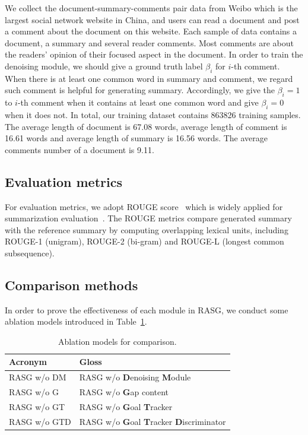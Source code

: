 \documentclass[letterpaper]{article}
\begin{document}
We collect the document-summary-comments pair data from Weibo which is the largest social network website in China, and users can read a document and post a comment about the document on this website.
Each sample of data contains a document, a summary and several reader comments.
Most comments are about the readers' opinion of their focused aspect in the document.
In order to train the denoising module, we should give a ground truth label $\beta_i$ for $i$-th comment.
When there is at least one common word in summary and comment, we regard such comment is helpful for generating summary.
Accordingly, we give the $\beta_i = 1$ to $i$-th comment when it contains at least one common word and give $\beta_i = 0$ when it does not.
In total, our training dataset contains 863826 training samples.
The average length of document is 67.08 words, average length of comment is 16.61 words and average length of summary is 16.56 words.
The average comments number of a document is 9.11.

\subsection{Evaluation metrics}

For evaluation metrics, we adopt ROUGE score~\cite{lin2004rouge} which is widely applied for summarization evaluation~\cite{Sun2018AUM,chen2018iterative}.
The ROUGE metrics compare generated summary with the reference summary by computing overlapping lexical units, including ROUGE-1 (unigram), ROUGE-2 (bi-gram) and ROUGE-L (longest common subsequence).

\subsection{Comparison methods}

In order to prove the effectiveness of each module in RASG, we conduct some ablation models introduced in Table~\ref{tab:ablations}.

\begin{table}[t]
\centering
\caption{Ablation models for comparison.}
\label{tab:ablations}
\small
\begin{tabular}{@{}l@{~}l}
\toprule
Acronym & Gloss \\
\midrule
RASG w/o DM &  \multicolumn{1}{p{5cm}}{\small RASG w/o \textbf{D}enoising \textbf{M}odule}\\
RASG w/o G &  \multicolumn{1}{p{5cm}}{\small RASG w/o \textbf{G}ap content}\\
RASG w/o GT &  \multicolumn{1}{p{5cm}}{\small RASG w/o \textbf{G}oal \textbf{T}racker}\\
RASG w/o GTD &  \multicolumn{1}{p{5cm}}{\footnotesize RASG w/o \textbf{G}oal \textbf{T}racker \textbf{D}iscriminator}\\
\bottomrule
\end{tabular}
\end{table}
\end{document}
